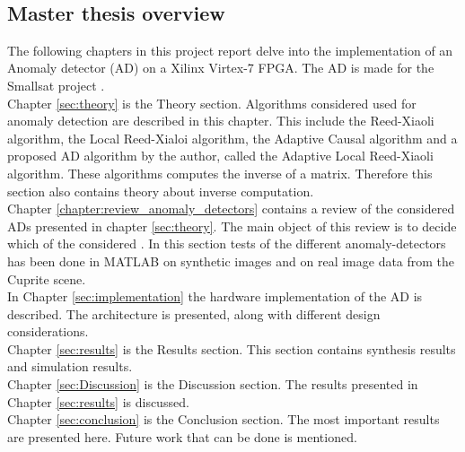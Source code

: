 
\\





\newpage
\subsection{Master thesis overview}
The following chapters in this project report delve into the implementation of an Anomaly detector (AD) on a Xilinx Virtex-7 FPGA. The AD is made for the Smallsat project \cite{SmallSat_project_description}. \\  

Chapter \ref{sec:theory} is the Theory section. Algorithms considered used for anomaly detection are described in this chapter. This include the Reed-Xiaoli algorithm, the Local Reed-Xialoi algorithm, the Adaptive Causal algorithm and a proposed AD algorithm by the author, called the Adaptive Local Reed-Xiaoli algorithm. These algorithms computes the inverse of a matrix. Therefore this section also contains theory about inverse computation.\\%


Chapter \ref{chapter:review_anomaly_detectors} contains a review of the considered ADs presented in chapter \ref{sec:theory}. The main object of this review is to decide which of the considered . In this section tests of the different anomaly-detectors has been done in MATLAB on synthetic images and on real image data from the Cuprite scene.\\  

In Chapter \ref{sec:implementation} the hardware implementation of the AD is described. The architecture is presented, along with different design considerations. \\

Chapter \ref{sec:results} is the Results section. This section contains synthesis results and simulation results.
\\

Chapter \ref{sec:Discussion} is the Discussion section. The results presented in Chapter \ref{sec:results} is discussed. 
\\

Chapter \ref{sec:conclusion} is the Conclusion section. The most important results are presented here.  Future work that can be done is mentioned.
\\





